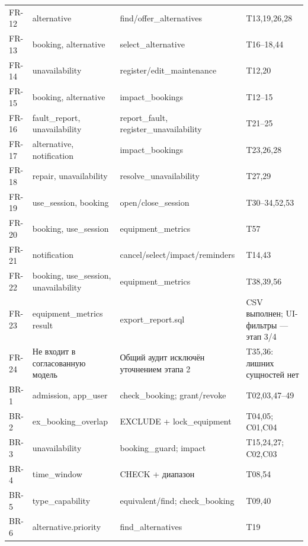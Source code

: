 \begin{singlespace}
\begin{longtable}{>{\raggedright\arraybackslash}p{}>{\raggedright\arraybackslash}p{}>{\raggedright\arraybackslash}p{}>{\raggedright\arraybackslash}p{}}
FR-12 & alternative & find/\allowbreak{}offer\_\allowbreak{}alternatives & T13,19,26,28 \\
FR-13 & booking, alternative & select\_\allowbreak{}alternative & T16–18,44 \\
FR-14 & unavailability & register/\allowbreak{}edit\_\allowbreak{}maintenance & T12,20 \\
FR-15 & booking, alternative & impact\_\allowbreak{}bookings & T12–15 \\
FR-16 & fault\_\allowbreak{}report, unavailability & report\_\allowbreak{}fault, register\_\allowbreak{}unavailability & T21–25 \\
FR-17 & alternative, notification & impact\_\allowbreak{}bookings & T23,26,28 \\
FR-18 & repair, unavailability & resolve\_\allowbreak{}unavailability & T27,29 \\
FR-19 & use\_\allowbreak{}session, booking & open/\allowbreak{}close\_\allowbreak{}session & T30–34,52,53 \\
FR-20 & booking, use\_\allowbreak{}session & equipment\_\allowbreak{}metrics & T57 \\
FR-21 & notification & cancel/\allowbreak{}select/\allowbreak{}impact/\allowbreak{}reminders & T14,43 \\
FR-22 & booking, use\_\allowbreak{}session, unavailability & equipment\_\allowbreak{}metrics & T38,39,56 \\
FR-23 & equipment\_\allowbreak{}metrics result & export\_\allowbreak{}report.sql & CSV выполнен; UI-фильтры — этап 3/\allowbreak{}4 \\
FR-24 & Не входит в согласованную модель & Общий аудит исключён уточнением этапа 2 & T35,36: лишних сущностей нет \\
BR-1 & admission, app\_\allowbreak{}user & check\_\allowbreak{}booking; grant/\allowbreak{}revoke & T02,03,47–49 \\
BR-2 & ex\_\allowbreak{}booking\_\allowbreak{}overlap & EXCLUDE + lock\_\allowbreak{}equipment & T04,05; C01,C04 \\
BR-3 & unavailability & booking\_\allowbreak{}guard; impact & T15,24,27; C02,C03 \\
BR-4 & time\_\allowbreak{}window & CHECK + диапазон & T08,54 \\
BR-5 & type\_\allowbreak{}capability & equivalent/\allowbreak{}find; check\_\allowbreak{}booking & T09,40 \\
BR-6 & alternative.priority & find\_\allowbreak{}alternatives & T19 \\

\end{longtable}
\end{singlespace}
